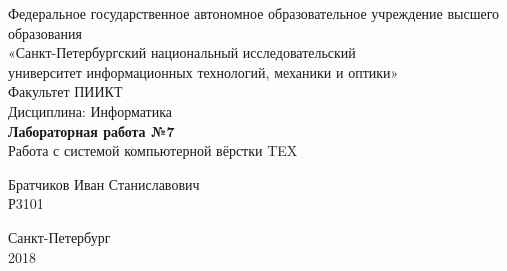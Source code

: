 \begin{center}
\large
Федеральное государственное автономное образовательное учреждение высшего образования \\
«Санкт-Петербургский национальный исследовательский \\
университет информационных технологий, механики и оптики»\\
\vspace{2cm}
Факультет ПИИКТ \\
Дисциплина: Информатика \\ \vspace{5cm}
\textbf{Лабораторная работа №7 \\}
Работа с системой компьютерной вёрстки TEX \vspace{5cm}
\end{center}
\begin{flushright}
Братчиков Иван Станиславович\\
Р3101 \\
\end{flushright}
\null\vfill
\begin{center}
Санкт-Петербург \\ 
2018
\end{center}